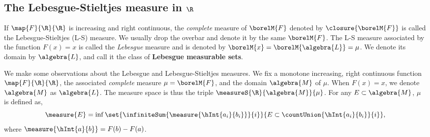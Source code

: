 \subsection{The Lebesgue-Stieltjes measure in $\R$}
\break{}

\begin{Definition}[name=Lebesgue-Stieltjes measure]
    If $\map{F}{\R}{\R}$ is increasing and right continuous, the \emph{complete} measure of
    $\borelM{F}$ denoted by $\closure{\borelM{F}}$ is called the Lebesgue-Stieltjes (L-S) measure. We
    usually drop the overbar and denote it by the same $\borelM{F}$. The L-S measure associated by
    the function $F(x) = x$ is called the \emph{Lebesgue} measure and is denoted by $\borelM{x} =
    \borelM{\algebra{L}} = \mu$. We denote its domain by $\algebra{L}$, and call it the class of
    \textbf{Lebesgue measurable sets}. 
\end{Definition}

We make some observations about the Lebesgue and Lebesgue-Stieltjes measures. We fix a monotone
increasing, right continuous function $\map{F}{\R}{\R}$, the associated \emph{complete} measure $\mu
= \borelM{F}$, and the domain $\algebra{M}$ of $\mu$. When $F(x) = x$, we denote $\algebra{M}$ as
$\algebra{L}$. The measure space is thus the triple $\measureS{\R}{\algebra{M}}{\mu}$. For any
$E\subset\algebra{M}$, $\mu$ is defined as,
\begin{equation}\label{eq:ls_measure}
    \measure{E} =
    \inf\set{\infiniteSum{\measure{\hInt{a_i}{b_i}}}{i}}{E\subset\countUnion{\hInt{a_i}{b_i}}{i}},
\end{equation}
where $\measure{\hInt{a}{b}} = F(b) - F(a)$.

